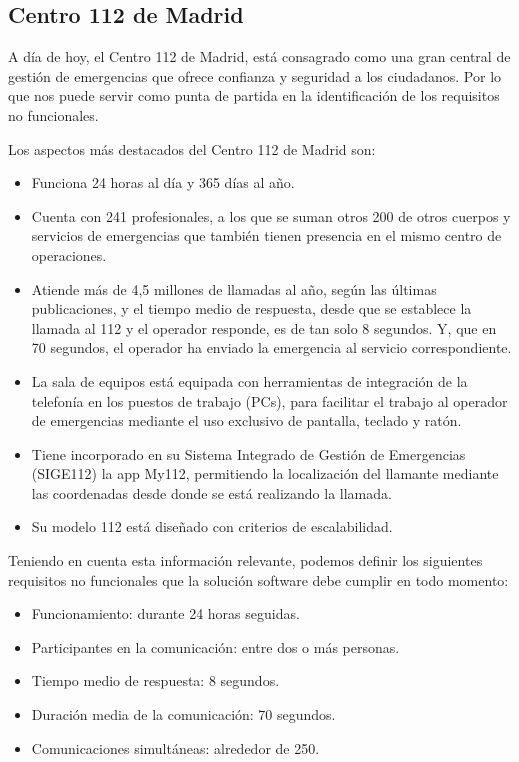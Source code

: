\subsection{Centro 112 de Madrid}

A día de hoy, el Centro 112 de Madrid, está consagrado como una gran central de gestión de emergencias que ofrece confianza y seguridad a los ciudadanos. Por lo que nos puede servir como punta de partida en la identificación de los requisitos no funcionales.

Los aspectos más destacados del Centro 112 de Madrid son:

\begin{itemize}
  \item Funciona 24 horas al día y 365 días al año.
  \item Cuenta con 241 profesionales, a los que se suman otros 200 de otros cuerpos y servicios de emergencias que también tienen presencia en el mismo centro de operaciones.
  \item Atiende más de 4,5 millones de llamadas al año, según las últimas publicaciones, y el tiempo medio de respuesta, desde que se establece la llamada al 112 y el operador responde, es de tan solo 8 segundos. Y, que en 70 segundos, el operador ha enviado la emergencia al servicio correspondiente.
  \item La sala de equipos está equipada con herramientas de integración de la telefonía en los puestos de trabajo (PCs), para facilitar el trabajo al operador de emergencias mediante el uso exclusivo de pantalla, teclado y ratón.
  \item Tiene incorporado en su Sistema Integrado de Gestión de Emergencias (SIGE112) la app My112, permitiendo la localización del llamante mediante las coordenadas desde donde se está realizando la llamada.
  \item Su modelo 112 está diseñado con criterios de escalabilidad.
\end{itemize}

Teniendo en cuenta esta información relevante, podemos definir los siguientes requisitos no funcionales que la solución software debe cumplir en todo momento:

\begin{itemize}
  \item Funcionamiento: durante 24 horas seguidas.
  \item Participantes en la comunicación: entre dos o más personas.
  \item Tiempo medio de respuesta: 8 segundos.
  \item Duración media de la comunicación: 70 segundos.
  \item Comunicaciones simultáneas: alrededor de 250.
\end{itemize}

